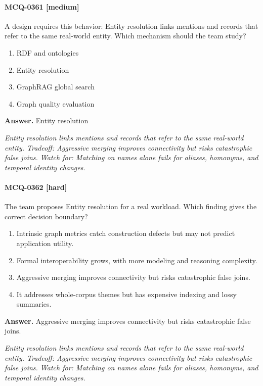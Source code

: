 \paragraph{MCQ-0361 [medium]} A design requires this behavior: Entity resolution links mentions and records that refer to the same real-world entity. Which mechanism should the team study?
\begin{enumerate}[label=\Alph*.]
\item RDF and ontologies
\item Entity resolution
\item GraphRAG global search
\item Graph quality evaluation
\end{enumerate}
\noindent\textbf{Answer.} Entity resolution
\par\textit{Entity resolution links mentions and records that refer to the same real-world entity. Tradeoff: Aggressive merging improves connectivity but risks catastrophic false joins. Watch for: Matching on names alone fails for aliases, homonyms, and temporal identity changes.}
\paragraph{MCQ-0362 [hard]} The team proposes Entity resolution for a real workload. Which finding gives the correct decision boundary?
\begin{enumerate}[label=\Alph*.]
\item Intrinsic graph metrics catch construction defects but may not predict application utility.
\item Formal interoperability grows, with more modeling and reasoning complexity.
\item Aggressive merging improves connectivity but risks catastrophic false joins.
\item It addresses whole-corpus themes but has expensive indexing and lossy summaries.
\end{enumerate}
\noindent\textbf{Answer.} Aggressive merging improves connectivity but risks catastrophic false joins.
\par\textit{Entity resolution links mentions and records that refer to the same real-world entity. Tradeoff: Aggressive merging improves connectivity but risks catastrophic false joins. Watch for: Matching on names alone fails for aliases, homonyms, and temporal identity changes.}
